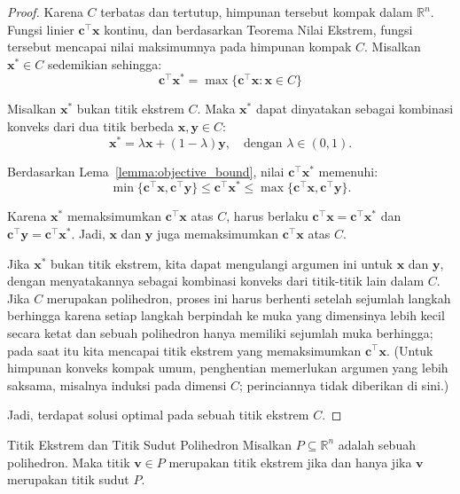 \begin{proof}
Karena \(C\) terbatas dan tertutup, himpunan tersebut kompak dalam \(\mathbb{R}^n\). Fungsi linier \(\mathbf{c}^\top \mathbf{x}\) kontinu, dan berdasarkan Teorema Nilai Ekstrem, fungsi tersebut mencapai nilai maksimumnya pada himpunan kompak \(C\). Misalkan \(\mathbf{x}^* \in C\) sedemikian sehingga:
\[
\mathbf{c}^\top \mathbf{x}^* = \max \{ \mathbf{c}^\top \mathbf{x} : {\mathbf{x} \in C} \}
\]

Misalkan \(\mathbf{x}^*\) bukan titik ekstrem \(C\). Maka \(\mathbf{x}^*\) dapat dinyatakan sebagai kombinasi konveks dari dua titik berbeda \(\mathbf{x}, \mathbf{y} \in C\):
\[
\mathbf{x}^* = \lambda \mathbf{x} + (1-\lambda) \mathbf{y}, \quad \text{dengan } \lambda \in (0, 1).
\]

Berdasarkan Lema~\ref{lemma:objective_bound}, nilai \(\mathbf{c}^\top \mathbf{x}^*\) memenuhi:
\[
\min\{\mathbf{c}^\top \mathbf{x}, \mathbf{c}^\top \mathbf{y}\} \leq \mathbf{c}^\top \mathbf{x}^* \leq \max\{\mathbf{c}^\top \mathbf{x}, \mathbf{c}^\top \mathbf{y}\}.
\]

Karena \(\mathbf{x}^*\) memaksimumkan \(\mathbf{c}^\top \mathbf{x}\) atas \(C\), harus berlaku \(\mathbf{c}^\top \mathbf{x} = \mathbf{c}^\top \mathbf{x}^*\) dan \(\mathbf{c}^\top \mathbf{y} = \mathbf{c}^\top \mathbf{x}^*\). Jadi, \(\mathbf{x}\) dan \(\mathbf{y}\) juga memaksimumkan \(\mathbf{c}^\top \mathbf{x}\) atas \(C\).

Jika \(\mathbf{x}^*\) bukan titik ekstrem, kita dapat mengulangi argumen ini untuk \(\mathbf{x}\) dan \(\mathbf{y}\), dengan menyatakannya sebagai kombinasi konveks dari titik-titik lain dalam \(C\). Jika \(C\) merupakan polihedron, proses ini harus berhenti setelah sejumlah langkah berhingga karena setiap langkah berpindah ke muka yang dimensinya lebih kecil secara ketat dan sebuah polihedron hanya memiliki sejumlah muka berhingga; pada saat itu kita mencapai titik ekstrem yang memaksimumkan \(\mathbf{c}^\top \mathbf{x}\). (Untuk himpunan konveks kompak umum, penghentian memerlukan argumen yang lebih saksama, misalnya induksi pada dimensi \(C\); perinciannya tidak diberikan di sini.)

Jadi, terdapat solusi optimal pada sebuah titik ekstrem \(C\).
\end{proof}

\begin{theorem}{Titik Ekstrem dan Titik Sudut Polihedron}
Misalkan \( P \subseteq \mathbb{R}^n \) adalah sebuah polihedron. Maka titik \( \mathbf{v} \in P \) merupakan titik ekstrem jika dan hanya jika \( \mathbf{v} \) merupakan titik sudut \( P \).
\end{theorem}

